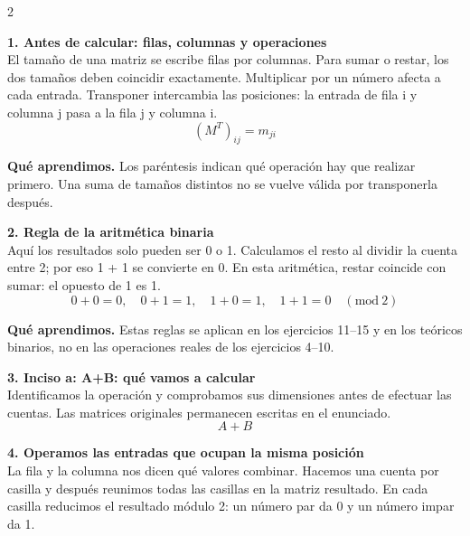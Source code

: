 \documentclass[11pt,a4paper,landscape]{article}
\begin{document}
\begin{multicols*}{2}
\noindent\begin{minipage}{\linewidth}\textbf{1. Antes de calcular: filas, columnas y operaciones}\\[2pt]El tamaño de una matriz se escribe filas por columnas. Para sumar o restar, los dos tamaños deben coincidir exactamente. Multiplicar por un número afecta a cada entrada. Transponer intercambia las posiciones: la entrada de fila i y columna j pasa a la fila j y columna i.
\[(M^T)_{ij}=m_{ji}\]
\par\smallskip\textbf{Qué aprendimos.} Los paréntesis indican qué operación hay que realizar primero. Una suma de tamaños distintos no se vuelve válida por transponerla después.
\end{minipage}\par\medskip
\noindent\begin{minipage}{\linewidth}\textbf{2. Regla de la aritmética binaria}\\[2pt]Aquí los resultados solo pueden ser 0 o 1. Calculamos el resto al dividir la cuenta entre 2; por eso 1 + 1 se convierte en 0. En esta aritmética, restar coincide con sumar: el opuesto de 1 es 1.
\[0+0=0,\quad 0+1=1,\quad1+0=1,\quad1+1=0\quad(\mathrm{mod}\ 2)\]
\par\smallskip\textbf{Qué aprendimos.} Estas reglas se aplican en los ejercicios 11–15 y en los teóricos binarios, no en las operaciones reales de los ejercicios 4–10.
\end{minipage}\par\medskip
\noindent\begin{minipage}{\linewidth}\textbf{3. Inciso a: A+B: qué vamos a calcular}\\[2pt]Identificamos la operación y comprobamos sus dimensiones antes de efectuar las cuentas. Las matrices originales permanecen escritas en el enunciado.
\[A+B\]
\end{minipage}\par\medskip
\noindent\begin{minipage}{\linewidth}\textbf{4. Operamos las entradas que ocupan la misma posición}\\[2pt]La fila y la columna nos dicen qué valores combinar. Hacemos una cuenta por casilla y después reunimos todas las casillas en la matriz resultado. En cada casilla reducimos el resultado módulo 2: un número par da 0 y un número impar da 1.

\end{minipage}
\end{multicols*}
\end{document}
